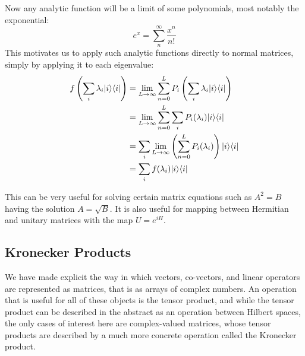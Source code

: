 Now any analytic function will be a limit of some polynomials, most notably the exponential:
\[e^x = \sum_n^\infty \frac{x^n}{n!}\]
This motivates us to apply such analytic functions directly to normal matrices, simply by applying it to each eigenvalue:
\begin{align*}
	f\left(\sum_i \lambda_i| i \rangle\langle i |\right)
	&= \lim_{L \to \infty} \sum_{n=0}^L P_i\left(\sum_i \lambda_i| i \rangle\langle i |\right)
	\\&= \lim_{L \to \infty} \sum_{n=0}^L \sum_i P_i(\lambda_i)| i \rangle\langle i |
	\\&= \sum_i \lim_{L \to \infty} \left(\sum_{n=0}^L  P_i(\lambda_i)\right)| i \rangle\langle i |
	\\&= \sum_i f(\lambda_i)| i \rangle\langle i |
\end{align*}

This can be very useful for solving certain matrix equations such as $A^2 = B$ having the solution $A = \sqrt{B}$. It is also useful for mapping between Hermitian and unitary matrices with the map $U = e^{iH}$.

\subsection{Kronecker Products}
We have made explicit the way in which vectors, co-vectors, and linear operators are represented as matrices, that is as arrays of complex numbers. An operation that is useful for all of these objects is the tensor product, and while the tensor product can be described in the abstract as an operation between Hilbert spaces, the only cases of interest here are complex-valued matrices, whose tensor products are described by a much more concrete operation called the Kronecker product.

